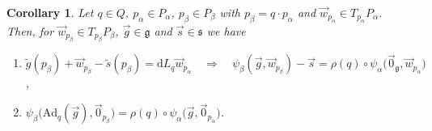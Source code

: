 \documentclass[11pt]{article}
\numberwithin{equation}{section}
\newtheorem{Corollary}[Theorem]{Corollary}
\newcommand{\wt}[1]{\widetilde{#1}}
\newcommand{\Add}[1]{\mathrm{Ad}_{#1}}
\begin{document}
\begin{Corollary}
\label{cor:psialpha}
Let $q\in Q$, $p_\alpha\in P_\alpha$, $p_\beta\in P_\beta$ with $p_\beta=q\cdot p_\alpha$ and $\vec{w}_{p_\alpha}\in
T_{p_\alpha}P_\alpha$.
Then, for $\vec{w}_{p_\beta}\in T_{p_\beta}P_\beta$, $\vec{g}\in \mathfrak{g}$ and $\vec{s}\in \mathfrak{s}$ we have
\begin{enumerate}\itemsep=0pt
\item[$i)$] $\wt{g}(p_\beta) + \vec{w}_{p_\beta}-\wt{s}(p_\beta)=\mathrm{d} L_q\vec{w}_{p_\alpha}
\quad
\Longrightarrow
\quad
\psi_\beta(\vec{g},\vec{w}_{p_\beta})-\vec{s}
=\rho(q)\circ\psi_\alpha\big(\vec{0}_{\mathfrak{g}},\vec{w}_{p_\alpha}\big)$,
\item[$ii)$] $\psi_\beta\big(\Add{q}(\vec{g}),\vec{0}_{p_\beta}\big)=\rho(q)\circ
\psi_\alpha\big(\vec{g},\vec{0}_{p_\alpha}\big)$.
\end{enumerate}
\end{Corollary}
\end{document}
